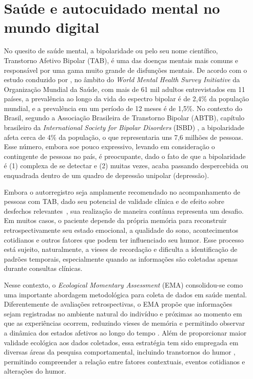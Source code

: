 \chapter{Saúde e autocuidado mental no mundo digital}


No quesito de saúde mental, a bipolaridade ou pelo seu nome científico,
Transtorno Afetivo Bipolar (TAB), é uma das doenças mentais mais comuns e
responsável por uma gama muito grande de disfunções mentais. De acordo com
o estudo conduzido por \citet{Merikangas2011}, no âmbito do \textit{World Mental
Health Survey Initiative} da Organização Mundial da Saúde, com mais de 61 mil
adultos entrevistados em 11 países, a prevalência ao longo da vida do espectro
bipolar é de 2,4\% da população mundial, e a prevalência em um período de 12
meses é de 1,5\%. No contexto do Brasil, segundo a Associação Brasileira de
Transtorno Bipolar (ABTB), capítulo brasileiro da \textit{International Society for
Bipolar Disorders} (ISBD) \citep{abtb}, a bipolaridade afeta cerca de
4\% da população, o que representaria uns 7,6 milhões de
pessoas. Esse número, embora soe pouco expressivo, levando em consideração o
contingente de pessoas no país, é preocupante, dado o fato de que a
bipolaridade é (1) complexa de se detectar e (2) muitas vezes, acaba passando
despercebida ou enquadrada dentro de um quadro de depressão unipolar
(depressão).

Embora o autorregistro seja amplamente recomendado no acompanhamento
de pessoas com TAB, dado seu potencial de validade clínica e de efeito
sobre desfechos relevantes~\cite{Faurholt:2016}, sua realização de
maneira contínua representa um desafio.
Em muitos casos, o paciente depende da própria memória para reconstruir
retrospectivamente seu estado emocional, a qualidade do sono,
acontecimentos cotidianos e outros fatores que podem ter influenciado
seu humor. Esse processo está sujeito, naturalmente, a vieses de
recordação e dificulta a identificação de padrões temporais, especialmente
quando as informações são coletadas apenas durante consultas clínicas.

Nesse contexto, o \textit{Ecological Momentary Assessment} (EMA)
consolidou-se como uma importante abordagem metodológica para coleta
de dados em saúde mental. Diferentemente de avaliações retrospectivas,
o EMA propõe que informações sejam registradas no ambiente natural do
indivíduo e próximas ao momento em que as experiências ocorrem, reduzindo
vieses de memória e permitindo observar a dinâmica dos estados afetivos
ao longo do tempo \citep{EbnerPriemer2009}. Além de proporcionar maior
validade ecológica aos dados coletados, essa estratégia tem sido
empregada em diversas áreas da pesquisa comportamental, incluindo
transtornos do humor \citep{Collins2003, EbnerPriemer2009}, permitindo
compreender a relação entre fatores contextuais, eventos cotidianos e
alterações do humor.

